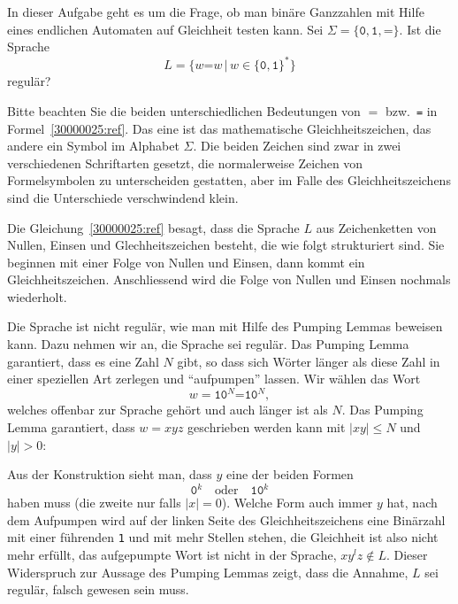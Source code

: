 In dieser Aufgabe geht es um die Frage, ob man binäre Ganzzahlen mit
Hilfe eines endlichen Automaten auf Gleichheit testen kann.
Sei $\Sigma=\{\texttt{0},\texttt{1},\texttt{=}\}$. Ist die Sprache
\begin{equation}
L=\{ w\texttt{=}w\,|\,w\in \{\texttt{0},\texttt{1}\}^*\}
\label{30000025:ref}
\end{equation}
regulär?


\begin{hinweis}
Bitte beachten Sie die beiden unterschiedlichen Bedeutungen von $=$
bzw.~\texttt{=} in Formel~\eqref{30000025:ref}.
Das eine ist das mathematische Gleichheitszeichen, das andere ein Symbol
im Alphabet $\Sigma$.
Die beiden Zeichen sind zwar in zwei verschiedenen Schriftarten gesetzt,
die normalerweise Zeichen von Formelsymbolen zu unterscheiden gestatten,
aber im Falle des Gleichheitszeichens sind die Unterschiede verschwindend
klein.

Die Gleichung~\eqref{30000025:ref} besagt, dass die Sprache $L$ aus
Zeichenketten von Nullen, Einsen und Glechheitszeichen besteht, die
wie folgt strukturiert sind.
Sie beginnen mit einer Folge von Nullen und Einsen, dann kommt ein
Gleichheitszeichen.
Anschliessend wird die Folge von Nullen und Einsen nochmals wiederholt.
\end{hinweis}

\begin{loesung}
Die Sprache ist nicht regulär, wie man mit Hilfe des Pumping
Lemmas beweisen kann.
Dazu nehmen wir an, die Sprache sei regulär.
Das Pumping Lemma garantiert, dass es eine Zahl $N$ gibt, so dass
sich Wörter länger als diese Zahl in einer speziellen Art
zerlegen und ``aufpumpen'' lassen.
Wir wählen das Wort
\[
w=\texttt{10}^N\texttt{=10}^N,
\]
welches offenbar zur Sprache gehört und auch länger ist als $N$.
Das Pumping Lemma garantiert, dass $w=xyz$  geschrieben werden kann
mit $|xy|\le N$ und $|y|>0$:
\begin{center}
\end{center}
Aus der Konstruktion sieht man, dass $y$ eine der beiden Formen
\[
\texttt{0}^k
\quad\text{oder}\quad
\texttt{10}^k
\]
haben muss (die zweite nur falls $|x|=0$).
Welche Form auch immer $y$ hat, nach dem Aufpumpen wird
auf der linken Seite des Gleichheitszeichens eine Binärzahl mit
einer führenden \texttt{1} und mit mehr Stellen stehen, die Gleichheit
ist also nicht mehr erfüllt, das aufgepumpte Wort ist nicht in der
Sprache, $xy^lz\not\in L$.
Dieser Widerspruch zur Aussage des Pumping
Lemmas zeigt, dass die Annahme, $L$ sei regulär, falsch gewesen
sein muss.
\end{loesung}


